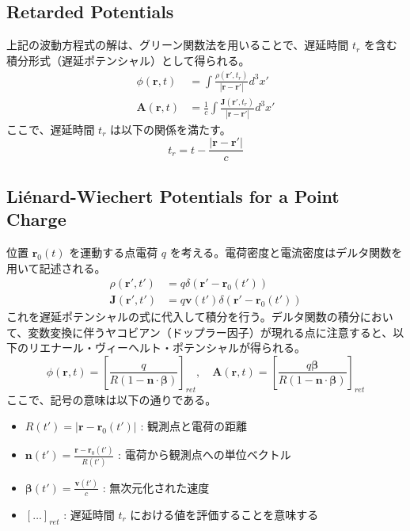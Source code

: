 \documentclass[a4paper,11pt]{bxjsarticle} %
\begin{document}
\subsection{Retarded Potentials}
上記の波動方程式の解は、グリーン関数法を用いることで、遅延時間 $t_r$ を含む積分形式（遅延ポテンシャル）として得られる。
\begin{align}
    \phi(\mathbf{r}, t) &= \int \frac{\rho(\mathbf{r}', t_r)}{|\mathbf{r} - \mathbf{r}'|} d^3x' \\
    \mathbf{A}(\mathbf{r}, t) &= \frac{1}{c} \int \frac{\mathbf{J}(\mathbf{r}', t_r)}{|\mathbf{r} - \mathbf{r}'|} d^3x'
\end{align}
ここで、遅延時間 $t_r$ は以下の関係を満たす。
\begin{equation}
    t_r = t - \frac{|\mathbf{r} - \mathbf{r}'|}{c}
\end{equation}

\subsection{Liénard-Wiechert Potentials for a Point Charge}
位置 $\mathbf{r}_0(t)$ を運動する点電荷 $q$ を考える。電荷密度と電流密度はデルタ関数を用いて記述される。
\begin{align}
    \rho(\mathbf{r}', t') &= q \delta(\mathbf{r}' - \mathbf{r}_0(t')) \\
    \mathbf{J}(\mathbf{r}', t') &= q \mathbf{v}(t') \delta(\mathbf{r}' - \mathbf{r}_0(t'))
\end{align}
これを遅延ポテンシャルの式に代入して積分を行う。デルタ関数の積分において、変数変換に伴うヤコビアン（ドップラー因子）が現れる点に注意すると、以下のリエナール・ヴィーヘルト・ポテンシャルが得られる。
\begin{equation}
    \phi(\mathbf{r}, t) = \left[ \frac{q}{R(1 - \mathbf{n} \cdot \boldsymbol{\beta})} \right]_{ret}, \quad
    \mathbf{A}(\mathbf{r}, t) = \left[ \frac{q \boldsymbol{\beta}}{R(1 - \mathbf{n} \cdot \boldsymbol{\beta})} \right]_{ret}
\end{equation}
ここで、記号の意味は以下の通りである。
\begin{itemize}
    \item $R(t') = |\mathbf{r} - \mathbf{r}_0(t')|$ : 観測点と電荷の距離
    \item $\mathbf{n}(t') = \frac{\mathbf{r} - \mathbf{r}_0(t')}{R(t')}$ : 電荷から観測点への単位ベクトル
    \item $\boldsymbol{\beta}(t') = \frac{\mathbf{v}(t')}{c}$ : 無次元化された速度
    \item $[\dots]_{ret}$ : 遅延時間 $t_r$ における値を評価することを意味する
\end{itemize}
\end{document}
